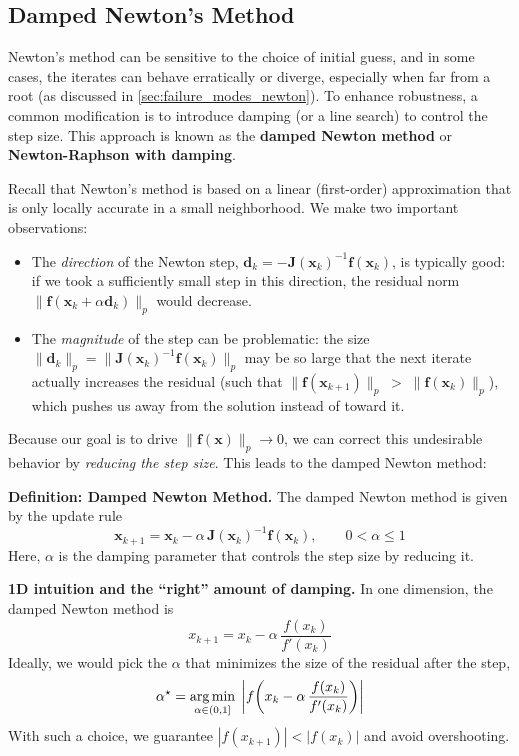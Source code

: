 \subsection{Damped Newton's Method}

Newton's method can be sensitive to the choice of initial guess, and in some cases, the iterates can behave erratically or diverge, especially when far from a root (as discussed in \autoref{sec:failure_modes_newton}). To enhance robustness, a common modification is to introduce damping (or a line search) to control the step size. This approach is known as the \textbf{damped Newton method} or \textbf{Newton-Raphson with damping}.

Recall that Newton's method is based on a linear (first-order) approximation that is only locally accurate in a small neighborhood. We make two important observations:
\begin{itemize}
  \item The \emph{direction} of the Newton step, 
  \(\mathbf{d}_k=-\mathbf{J}(\mathbf{x}_k)^{-1}\mathbf{f}(\mathbf{x}_k)\), is typically good: if we took a sufficiently small step in this direction, the residual norm 
  \(\lVert \mathbf{f}(\mathbf{x}_k+\alpha \mathbf{d}_k)\rVert_p\) 
  would decrease.
  \item The \emph{magnitude} of the step can be problematic: the size 
  \(\lVert \mathbf{d}_k\rVert_p=\lVert \mathbf{J}(\mathbf{x}_k)^{-1}\mathbf{f}(\mathbf{x}_k)\rVert_p\) 
  may be so large that the next iterate actually increases the residual (such that \( \lVert \mathbf{f}(\mathbf{x}_{k+1})\rVert_p \;>\; \lVert \mathbf{f}(\mathbf{x}_k)\rVert_p \)), which pushes us away from the solution instead of toward it.
\end{itemize}
Because our goal is to drive \(\lVert \mathbf{f}(\mathbf{x})\rVert_p \to 0\), we can correct this undesirable behavior by \emph{reducing the step size}. This leads to the damped Newton method:
\begin{definitionBox}
    \textbf{Definition: Damped Newton Method.}
    The damped Newton method is given by the update rule
    \begin{equation}
    \mathbf{x}_{k+1}=\mathbf{x}_k-\alpha\,\mathbf{J}(\mathbf{x}_k)^{-1}\mathbf{f}(\mathbf{x}_k),\qquad 0<\alpha\le 1
    \end{equation}
    Here, $\alpha$ is the damping parameter that controls the step size by reducing it.
\end{definitionBox}

\textbf{1D intuition and the ``right'' amount of damping.} In one dimension, the damped Newton method is
\begin{equation}
x_{k+1}=x_k-\alpha\,\frac{f(x_k)}{f'(x_k)}
\end{equation}
Ideally, we would pick the \(\alpha\) that minimizes the size of the residual after the step,
\begin{equation}
\alpha^\star = \operatorname*{arg\,min}_{\alpha\in(0,1]}\; \left| f\!\left(x_k-\alpha\,\frac{f(x_k)}{f'(x_k)}\right) \right|
\end{equation}
With such a choice, we guarantee \(|f(x_{k+1})|<|f(x_k)|\) and avoid overshooting.

